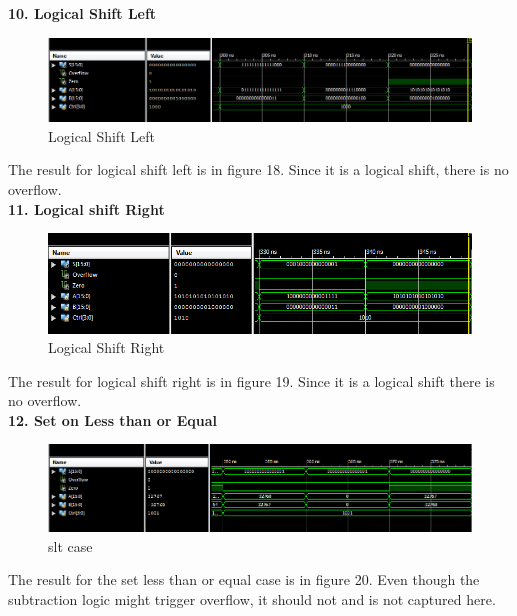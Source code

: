 \documentclass{article}
\begin{document}
\textbf{10. Logical Shift Left}\\
\begin{figure}[!htb]
  \centering
  \includegraphics[width=\linewidth]{1000.PNG}
  \caption{Logical Shift Left}
  \label{fig:log left}
\end{figure}
The result for logical shift left is in figure 18. Since it is a logical shift, there is no overflow. \\

\textbf{11. Logical shift Right}\\
\begin{figure}[!htb]
  \centering
  \includegraphics[width=\linewidth]{1010.PNG}
  \caption{Logical Shift Right}
  \label{fig:log right}
\end{figure}
The result for logical shift right is in figure 19. Since it is a logical shift there is no overflow.\\

\textbf{12. Set on Less than or Equal}\\
\begin{figure}[!htb]
  \centering
  \includegraphics[width=\linewidth]{1001.PNG}
  \caption{slt case}
  \label{fig:slt}
\end{figure}

The result for the set less than or equal case is in figure 20. Even though the subtraction logic might trigger overflow, it should not and is not captured here. 
\end{document}
